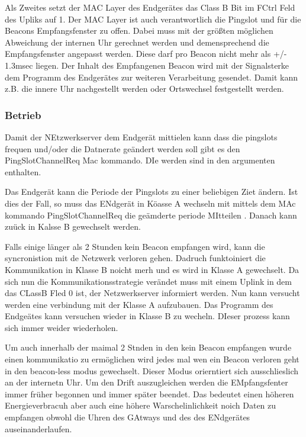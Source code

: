 \documentclass[a4paper,12pt]{article}
\begin{document}
                Als Zweites setzt der MAC Layer des Endgerätes das Class B Bit im FCtrl Feld des Upliks auf 1. Der MAC 
                Layer ist auch verantwortlich die Pingslot und für die Beacons Empfangsfenster zu offen. Dabei muss mit 
                der größten möglichen Abweichung der internen Uhr gerechnet werden und demensprechend die 
                Empfangsfenster angepasst werden. Diese darf pro Beacon nicht mehr als +/- 1.3msec liegen. 
                \cite[S.73]{LoRaSpec}Der Inhalt des Empfangenen Beacon wird mit der Signalsterke dem Programm des 
                Endgerätes zur weiteren Verarbeitung gesendet. Damit kann z.B. die innere Uhr nachgestellt werden 
                oder Ortswechsel festgestellt werden.
            \subsubsection{Betrieb}
                
                Damit der NEtzwerkserver dem Endgerät mittielen kann dass die pingslots frequen und/oder die Datnerate geändert werden soll gibt es den PingSlotChannelReq Mac kommando. DIe werden sind in den argumenten enthalten.
                    
                Das Endgerät kann die Periode der Pingslots zu einer beliebigen Ziet ändern. Ist dies der Fall, so muss das ENdgerät in Köasse A wechseln mit mittels dem MAc kommando
                PingSlotChannelReq die geämderte periode MItteilen . Danach kann zuück in Kalsse B gewechselt werden.

                Falls einige länger als 2 Stunden kein Beacon empfangen wird, kann die syncronistion mit de Netzwerk verloren gehen. Dadruch funktoiniert die Kommunikation in Klasse B noicht merh und es wird in Klasse A gewechselt. Da sich nun die 
                Kommunikationsstrategie verändet muss mit einem Uplink in dem das CLassB Fled 0 ist, der Netzwerkserver informiert werden. Nun kann versucht werden eine verbindung mit der Klasse A aufzubauen. Das Programm des Endgeätes kann versuchen
                wieder in Klasse B zu wecheln. DIeser prozess kann sich immer weider wiederholen.

                Um auch innerhalb der maimal 2 Stnden in den kein Beacon empfangen wurde einen kommunikatio zu ermöglichen wird jedes mal wen ein Beacon verloren geht in den beacon-less modus gewechselt. Dieser Modus orierntiert sich ausschlieslich an der internetn Uhr.
                Um den Drift auszugleichen werden die EMpfangsfenter immer früher begonnen und immer später beendet. Das bedeutet einen höheren Energieverbracuh aber auch eine höhere Warschelinlichkeit noich Daten zu empfangen obwohl die Uhren des GAtways und des des ENdgerätes auseinanderlaufen.
\end{document}
